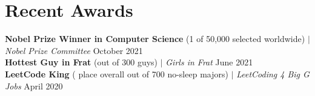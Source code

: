 \documentclass[letterpaper, 11pt]{article}
\begin{document}
 \section{Recent Awards}
  \begin{itemize}[leftmargin=0.15in, label={}]
    \small{\item{
     \textbf{Nobel Prize Winner in Computer Science}\hspace{1pt} (1 of 50,000 selected worldwide) $|$ \emph{Nobel Prize Committee} \hspace*{\fill} October 2021 \\
     \textbf{Hottest Guy in Frat}\hspace{1pt} (out of 300 guys) $|$ \emph{Girls in Frat} \hspace*{\fill} June 2021 \\
     \textbf{LeetCode King}\hspace{1pt} ( place overall out of 700 no-sleep majors) $|$ \emph{LeetCoding 4 Big G Jobs} \hspace*{\fill} April 2020 \\
    }}
 \end{itemize}
 
\end{document}
